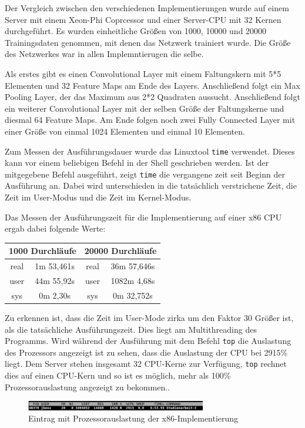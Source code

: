 \documentclass[../main.tex]{subfiles}
\begin{document}
Der Vergleich zwischen den verschiedenen Implementierungen wurde auf einem Server mit einem Xeon-Phi Coprcessor und einer Server-CPU mit 32 Kernen durchgeführt. Es wurden einheitliche Größen von 1000, 10000 und 20000 Trainingsdaten genommen, mit denen das Netzwerk trainiert wurde. Die Größe des Netzwerkes war in allen Implemntierugen die selbe.

Als erstes gibt es einen Convolutional Layer mit einem Faltungskern mit 5*5 Elementen und 32 Feature Maps am Ende des Layers. Anschließend folgt ein Max Pooling Layer, der das Maximum aus 2*2 Quadraten aussucht. Anschließend folgt ein weiterer Convolutional Layer mit der selben Größe der Faltungskerne und diesmal 64 Feature Maps. Am Ende folgen noch zwei Fully Connected Layer mit einer Größe von einmal 1024 Elementen und einmal 10 Elementen.

Zum Messen der Ausführungsdauer wurde das Linuxtool \texttt{time} verwendet. Dieses kann vor einem beliebigen Befehl in der Shell geschrieben werden. Ist der mitgegebene Befehl ausgeführt, zeigt \texttt{time} die vergangene zeit seit Beginn der Ausführung an. Dabei wird unterschieden in die tatsächlich verstrichene Zeit, die Zeit im User-Modus und die Zeit im Kernel-Modus.

Das Messen der Ausführungszeit für die Implementierung auf einer x86 CPU ergab dabei folgende Werte:\par

\begin{tabular}{|c|c||c|c|}
	\hline
	\multicolumn{2}{|c||}{1000 Durchläufe} & \multicolumn{2}{c|}{20000 Durchläufe} \\ \hline
	real & 1m 53,461s & real & 36m 57,646s\\ 
	\hline
	user & 44m 55,92s & user & 1082m 4,68s \\ 
	\hline
	sys & 0m 2,30s & sys & 0m 32,752s\\ 
	\hline
\end{tabular}

Zu erkennen ist, dass die Zeit im User-Mode zirka um den Faktor 30 Größer ist, als die tatsächliche Ausführungszeit.
Dies liegt am Multithreading des Programms. Wird während der Ausführung mit dem Befehl \texttt{top} die Auslastung des Prozessors angezeigt ist zu sehen, dass die Auslastung der CPU bei 2915\% liegt. Dem Server stehen insgesamt 32 CPU-Kerne zur Verfügung, \texttt{top} rechnet dies auf einen CPU-Kern und so ist es möglich, mehr als 100\% Prozessorauslastung angezeigt zu bekommen.. 
\begin{figure}[!htbp]
	\centering
	\includegraphics[width=0.7\textwidth]{../images/Benz/screenshot_top.png} %
	\caption{Eintrag mit Prozessorauslastung der x86-Implementierung} 
	\label{fig:conv_layer_seriell}
\end{figure}
 
\end{document}
